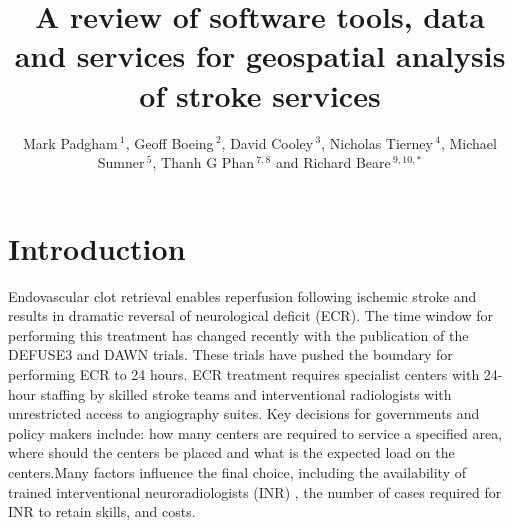 \documentclass[utf8]{frontiersHLTH}
\def\firstAuthorLast{Padgham {et~al.}} %
\def\Authors{Mark Padgham\,$^{1}$, Geoff Boeing\,$^{2}$, David Cooley\,$^{3}$, Nicholas Tierney\,$^{4}$, Michael Sumner\,$^{5}$, Thanh G Phan\,$^{7,8}$ and Richard Beare\,$^{9,10,*}$}
\begin{document}
\onecolumn
{}

\title[Software tools for geospatial analysis]{A review of software tools, data and services for geospatial analysis of stroke services}

\author[\firstAuthorLast ]{\Authors} %
\address{} %
\correspondance{} %

\extraAuth{}%

\maketitle

\section{Introduction}\label{introduction}

Endovascular clot retrieval enables reperfusion following ischemic
stroke and results in dramatic reversal of neurological deficit
(ECR)\cite{berkhemer2015randomized,goyal2016endovascular,goyal2015randomized,campbell2015endovascular,saver2015stent}. The
time window for performing this treatment has changed recently with
the publication of the DEFUSE3 and DAWN trials. These trials have
pushed the boundary for performing ECR to 24
hours\cite{nogueira2018thrombectomy}. ECR treatment requires
specialist centers with 24-hour staffing by skilled stroke teams and
interventional radiologists with unrestricted access to angiography
suites. Key decisions for governments and policy makers include: how
many centers are required to service a specified area, where should
the centers be placed and what is the expected load on the
centers\cite{Phan_2017}.Many factors influence the final choice,
including the availability of trained interventional neuroradiologists
(INR) , the number of cases required for INR to retain skills, and
costs.
\end{document}
